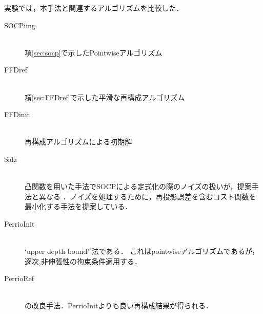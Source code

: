 \documentclass[10.5pt,twocolumn,a4j,fleqn]{ujarticle}
\begin{document}
実験では，本手法と関連するアルゴリズムを比較した．
\begin{description}
    \item[SOCPimg]\mbox{}\\ 
        項\ref{sec:socp}で示したPointwiseアルゴリズム
    \item[FFDref]\mbox{}\\
        項\ref{sec:FFDref}で示した平滑な再構成アルゴリズム
    \item[FFDinit]\mbox{}\\
        再構成アルゴリズムによる初期解
    \item[Salz]\mbox{}\\
        凸関数を用いた手法でSOCPによる定式化の際のノイズの扱いが，提案手法と異なる \cite{Salzmann2009}．ノイズを処理するために，再投影誤差を含むコスト関数を最小化する手法を提案している．
    \item[PerrioInit]\mbox{}\\
        `upper depth bound' 法である\cite{Perriollat2011a}． これはpointwiseアルゴリズムであるが，逐次,非伸張性の拘束条件適用する．
    \item[PerrioRef]\mbox{}\\
        \cite{Perriollat2011a}の改良手法．PerrioInitよりも良い再構成結果が得られる．
\end{description}
\end{document}
